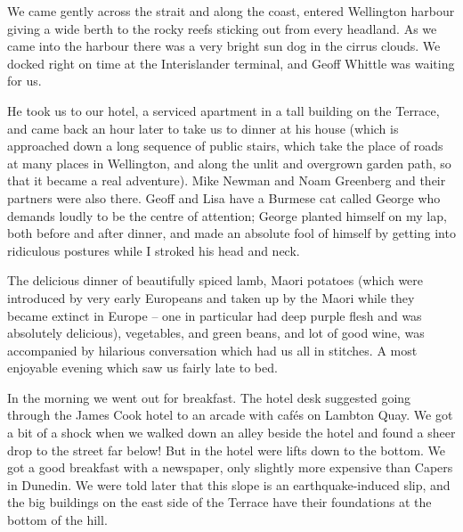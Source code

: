 \documentclass[12pt,a4paper]{article}
\begin{document}
We came gently across the strait and along the coast, entered Wellington
harbour giving a wide berth to the rocky reefs sticking out from every
headland. As we came into the harbour there was a very bright sun dog in
the cirrus clouds. We docked right on time at the Interislander terminal,
and Geoff Whittle was waiting for us.

He took us to our hotel, a serviced apartment in a tall building on the Terrace,
and came back an hour later to take us to dinner at his house (which is
approached down a long sequence of public stairs, which take the place of
roads at many places in Wellington, and along the unlit and overgrown
garden path, so that it became a real adventure). Mike Newman
and Noam Greenberg and their partners were also there. Geoff and Lisa have
a Burmese cat called George who demands loudly to be the centre of attention;
George planted himself on my lap, both before and after dinner, and made an
absolute fool of himself by getting into ridiculous postures while I stroked
his head and neck.

The delicious dinner of beautifully spiced lamb, Maori potatoes (which were
introduced by very early Europeans and taken up by the Maori while they
became extinct in Europe -- one in particular had deep purple flesh and was
absolutely delicious), vegetables, and green beans, and lot of good wine, was
accompanied by hilarious conversation which had us all in stitches. A most
enjoyable evening which saw us fairly late to bed.

In the morning we went out for breakfast. The hotel desk suggested going
through the James Cook hotel to an arcade with caf\'es on Lambton Quay. 
We got
a bit of a shock when we walked down an alley beside the hotel and found a 
sheer drop to the street far below! But in the hotel were lifts down to the 
bottom. We got a good breakfast with a newspaper, only slightly more expensive
than Capers in Dunedin. We were told later that this slope is an 
earthquake-induced slip, and the big buildings on the east side of the
Terrace have their foundations at the bottom of the hill.
\end{document}
